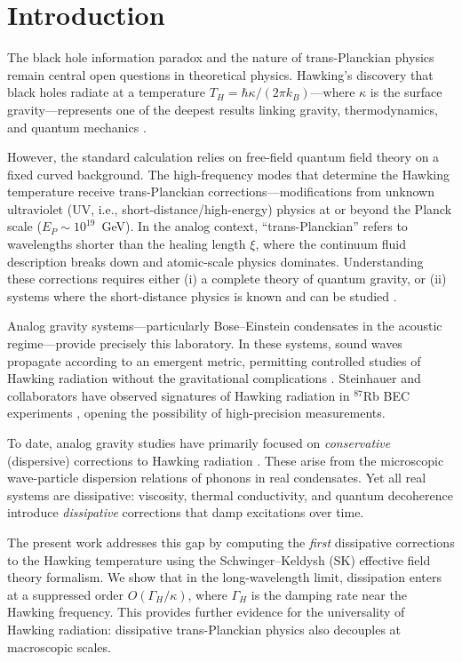 \documentclass[aps,prl,twocolumn,superscriptaddress,nofootinbib,amsmath,amssymb]{revtex4-2}
\begin{document}
\section{Introduction}
\label{sec:intro}

The black hole information paradox and the nature of trans-Planckian physics remain central open questions in theoretical physics. Hawking's discovery that black holes radiate at a temperature $T_H = \hbar \kappa / (2\pi k_B)$---where $\kappa$ is the surface gravity---represents one of the deepest results linking gravity, thermodynamics, and quantum mechanics \cite{Hawking1974}.

However, the standard calculation relies on free-field quantum field theory on a fixed curved background. The high-frequency modes that determine the Hawking temperature receive trans-Planckian corrections---modifications from unknown ultraviolet (UV, i.e., short-distance/high-energy) physics at or beyond the Planck scale ($E_P \sim 10^{19}$~GeV). In the analog context, ``trans-Planckian'' refers to wavelengths shorter than the healing length $\xi$, where the continuum fluid description breaks down and atomic-scale physics dominates. Understanding these corrections requires either (i) a complete theory of quantum gravity, or (ii) systems where the short-distance physics is known and can be studied \cite{Corley1996,Jacobson1996}.

Analog gravity systems---particularly Bose--Einstein condensates in the acoustic regime---provide precisely this laboratory. In these systems, sound waves propagate according to an emergent metric, permitting controlled studies of Hawking radiation without the gravitational complications \cite{Unruh1981}. Steinhauer and collaborators have observed signatures of Hawking radiation in $^{87}$Rb BEC experiments \cite{Steinhauer2019}, opening the possibility of high-precision measurements.

To date, analog gravity studies have primarily focused on \textit{conservative} (dispersive) corrections to Hawking radiation \cite{Coutant2014,Berti2025}. These arise from the microscopic wave-particle dispersion relations of phonons in real condensates. Yet all real systems are dissipative: viscosity, thermal conductivity, and quantum decoherence introduce \textit{dissipative} corrections that damp excitations over time.

The present work addresses this gap by computing the \textit{first} dissipative corrections to the Hawking temperature using the Schwinger--Keldysh (SK) effective field theory formalism. We show that in the long-wavelength limit, dissipation enters at a suppressed order $O(\Gamma_H / \kappa)$, where $\Gamma_H$ is the damping rate near the Hawking frequency. This provides further evidence for the universality of Hawking radiation: dissipative trans-Planckian physics also decouples at macroscopic scales.
\end{document}
